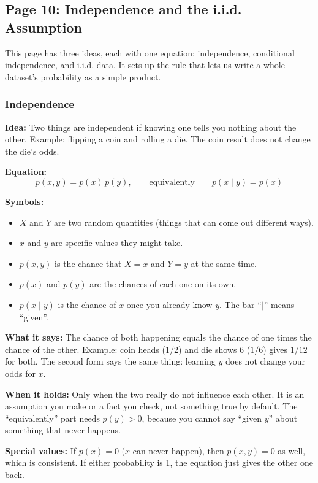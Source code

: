 \subsection*{Page 10: Independence and the i.i.d. Assumption}

This page has three ideas, each with one equation: independence, conditional independence, and i.i.d. data. It sets up the rule that lets us write a whole dataset's probability as a simple product.

\subsubsection*{Independence}

\textbf{Idea:} Two things are independent if knowing one tells you nothing about the other. Example: flipping a coin and rolling a die. The coin result does not change the die's odds.

\textbf{Equation:}
\[
p(x, y) = p(x)\,p(y), \qquad \text{equivalently} \qquad p(x \mid y) = p(x)
\]

\textbf{Symbols:}
\begin{itemize}
  \item $X$ and $Y$ are two random quantities (things that can come out different ways).
  \item $x$ and $y$ are specific values they might take.
  \item $p(x, y)$ is the chance that $X = x$ and $Y = y$ at the same time.
  \item $p(x)$ and $p(y)$ are the chances of each one on its own.
  \item $p(x \mid y)$ is the chance of $x$ once you already know $y$. The bar ``$\mid$'' means ``given''.
\end{itemize}

\textbf{What it says:} The chance of both happening equals the chance of one times the chance of the other. Example: coin heads ($1/2$) and die shows 6 ($1/6$) gives $1/12$ for both. The second form says the same thing: learning $y$ does not change your odds for $x$.

\textbf{When it holds:} Only when the two really do not influence each other. It is an assumption you make or a fact you check, not something true by default. The ``equivalently'' part needs $p(y) > 0$, because you cannot say ``given $y$'' about something that never happens.

\textbf{Special values:} If $p(x) = 0$ ($x$ can never happen), then $p(x, y) = 0$ as well, which is consistent. If either probability is 1, the equation just gives the other one back.

